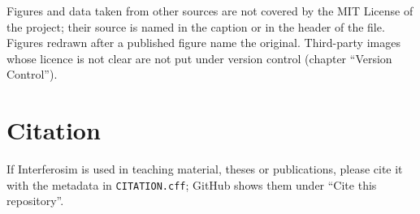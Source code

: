 Figures and data taken from other sources are not covered by the MIT
License of the project; their source is named in the caption or in the
header of the file. Figures redrawn after a published figure name the
original. Third-party images whose licence is not clear are not put
under version control (chapter \enquote{Version Control}).

\section{Citation}

If Interferosim is used in teaching material, theses or publications,
please cite it with the metadata in \texttt{CITATION.cff}; GitHub shows
them under \enquote{Cite this repository}.
